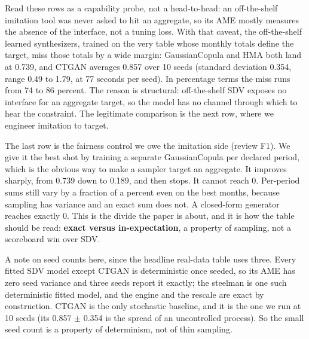 Read these rows as a capability probe, not a head-to-head: an
off-the-shelf imitation tool was never asked to hit an aggregate, so its
AME mostly measures the absence of the interface, not a tuning loss.
With that caveat, the off-the-shelf learned synthesizers, trained on the
very table whose monthly totals define the target, miss those totals by
a wide margin: GaussianCopula and HMA both land at 0.739, and CTGAN
averages 0.857 over 10 seeds (standard deviation 0.354, range 0.49 to
1.79, at 77 seconds per seed). In percentage terms the miss runs from 74
to 86 percent. The reason is structural: off-the-shelf SDV exposes no
interface for an aggregate target, so the model has no channel through
which to hear the constraint. The legitimate comparison is the next row,
where we engineer imitation to target.

The last row is the fairness control we owe the imitation side (review
F1). We give it the best shot by training a separate GaussianCopula per
declared period, which is the obvious way to make a sampler target an
aggregate. It improves sharply, from 0.739 down to 0.189, and then
stops. It cannot reach 0. Per-period sums still vary by a fraction of a
percent even on the best months, because sampling has variance and an
exact sum does not. A closed-form generator reaches exactly 0. This is
the divide the paper is about, and it is how the table should be read:
\textbf{exact versus in-expectation}, a property of sampling, not a
scoreboard win over SDV.

A note on seed counts here, since the headline real-data table uses
three. Every fitted SDV model except CTGAN is deterministic once seeded,
so its AME has zero seed variance and three seeds report it exactly; the
steelman is one such deterministic fitted model, and the engine and the
rescale are exact by construction. CTGAN is the only stochastic
baseline, and it is the one we run at 10 seeds (its 0.857
\ensuremath{\pm} 0.354 is the spread of an uncontrolled process). So the
small seed count is a property of determinism, not of thin sampling.

